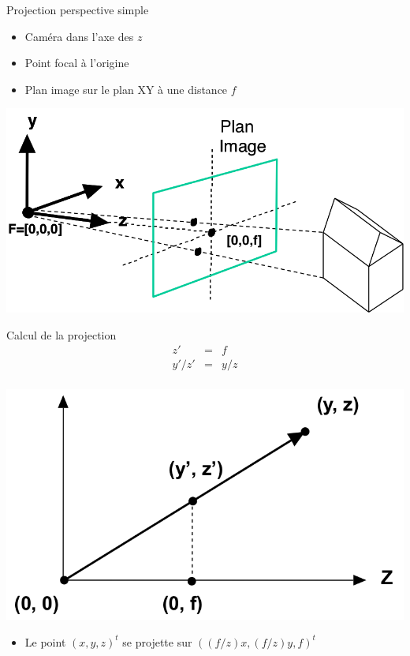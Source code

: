 \begin{frame}{Projection perspective simple}
\begin{itemize}
\item Caméra dans l'axe des $z$
\item Point focal à l'origine
\item Plan image sur le plan XY à une distance $f$
\end{itemize}
\begin{center}
\includegraphics[height=.6\textheight]{figs/persp2.png}
\end{center}
\end{frame}

\begin{frame}{Calcul de la projection}
\begin{eqnarray*}
z' & = & f \\
y'/z' & = & y/z \\
\end{eqnarray*}
\begin{center}
\includegraphics[height=.4\textheight]{figs/persp3.png}
\end{center}
\begin{itemize}
\item Le point $(x,y,z)^t$ se projette sur $\left( (f/z)x,(f/z)y,f \right)^t$
\end{itemize}
\end{frame}

